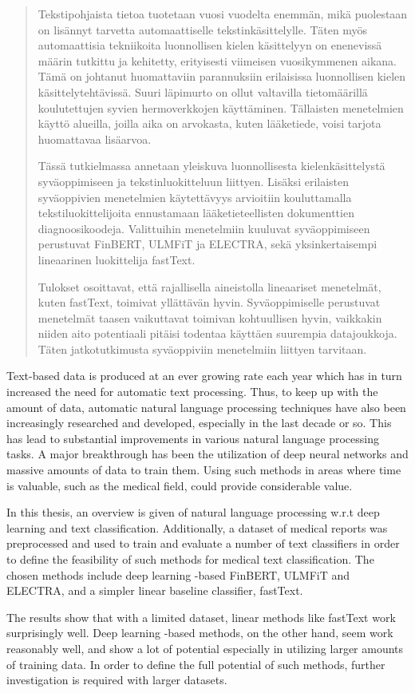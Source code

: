 \begin{abstract}
Tekstipohjaista tietoa tuotetaan vuosi vuodelta enemmän, mikä puolestaan on lisännyt tarvetta automaattiselle tekstinkäsittelylle.
Täten myös automaattisia tekniikoita luonnollisen kielen käsittelyyn on enenevissä määrin tutkittu ja kehitetty, erityisesti viimeisen vuosikymmenen aikana.
Tämä on johtanut huomattaviin parannuksiin erilaisissa luonnollisen kielen käsittelytehtävissä.
Suuri läpimurto on ollut valtavilla tietomäärillä koulutettujen syvien hermoverkkojen käyttäminen.
Tällaisten menetelmien käyttö alueilla, joilla aika on arvokasta, kuten lääketiede, voisi tarjota huomattavaa lisäarvoa.

Tässä tutkielmassa annetaan yleiskuva luonnollisesta kielenkäsittelystä syväoppimiseen ja tekstinluokitteluun liittyen.
Lisäksi erilaisten syväoppivien menetelmien käytettävyys arvioitiin kouluttamalla tekstiluokittelijoita ennustamaan lääketieteellisten dokumenttien diagnoosikoodeja.
Valittuihin menetelmiin kuuluvat syväoppimiseen perustuvat FinBERT, ULMFiT ja ELECTRA, sekä yksinkertaisempi lineaarinen luokittelija fastText.

Tulokset osoittavat, että rajallisella aineistolla lineaariset menetelmät, kuten fastText, toimivat yllättävän hyvin.
Syväoppimiselle perustuvat menetelmät taasen vaikuttavat toimivan kohtuullisen hyvin, vaikkakin niiden aito potentiaali pitäisi todentaa käyttäen suurempia datajoukkoja.
Täten jatkotutkimusta syväoppiviin menetelmiin liittyen tarvitaan.
\end{abstract}

\begin{abstracten}
Text-based data is produced at an ever growing rate each year which has in turn increased the need for automatic text processing.
Thus, to keep up with the amount of data, automatic natural language processing techniques have also been increasingly researched and developed, especially in the last decade or so.
This has lead to substantial improvements in various natural language processing tasks.
A major breakthrough has been the utilization of deep neural networks and massive amounts of data to train them.
Using such methods in areas where time is valuable, such as the medical field, could provide considerable value.

In this thesis, an overview is given of natural language processing w.r.t deep learning and text classification.
Additionally, a dataset of medical reports was preprocessed and used to train and evaluate a number of text classifiers in order to define the feasibility of such methods for medical text classification.
The chosen methods include deep learning -based FinBERT, ULMFiT and ELECTRA, and a simpler linear baseline classifier, fastText.

The results show that with a limited dataset, linear methods like fastText work surprisingly well.
Deep learning -based methods, on the other hand, seem work reasonably well, and show a lot of potential especially in utilizing larger amounts of training data.
In order to define the full potential of such methods, further investigation is required with larger datasets.
\end{abstracten}
